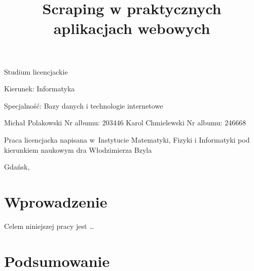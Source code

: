 \documentclass[12pt,a4paper,oneside,openany,parskip=full,parindent=full]{book}
\begin{document}
\begin{center}

\vspace{1cm}

Studium licencjackie
\end{center}

\vspace{1cm}

\noindent Kierunek: Informatyka

\noindent Specjalność: Bazy danych i technologie internetowe

\vspace{1cm}

{
\leftskip=10cm\noindent
Michał Polakowski\newline
Nr albumu: 203446\newline
Karol Chmielewski\newline
Nr albumu: 246668
}

\vspace{2cm}

\title{Scraping w praktycznych aplikacjach webowych}
\makeatletter

\begin{center}
\LARGE\bf
\@title
\end{center}

\vspace{2cm}

{
\leftskip=10cm\noindent
Praca licencjacka\newline 
napisana w~Instytucie Matematyki, Fizyki i Informatyki\newline
pod kierunkiem naukowym\newline
dra Włodzimierza Bzyla

}

\vfill

\begin{center}
Gdańsk, \the\year
\end{center}
\thispagestyle{empty}

\clearpage
\thispagestyle{empty}
\clearpage

\tableofcontents

\clearpage


\chapter{Wprowadzenie}

Celem niniejszej pracy jest \ldots



\chapter{Podsumowanie}



\clearpage
{}
\begin{thebibliography}{99}
\setlength{\itemsep}{0pt}
\end{thebibliography}

\clearpage
\end{document}
